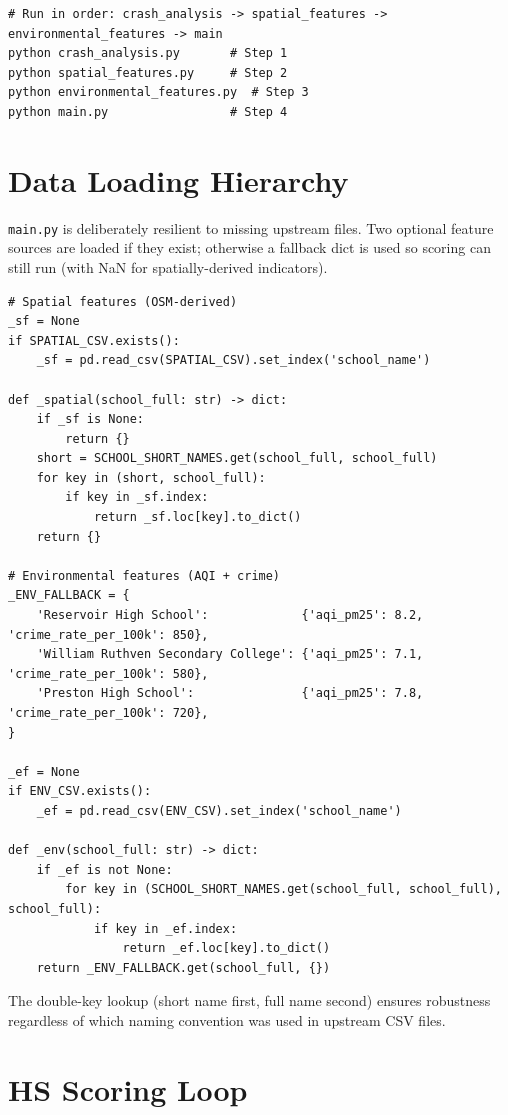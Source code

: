 \documentclass[11pt,a4paper,openany]{book}
\begin{document}
\begin{lstlisting}[style=bash, caption={Running main.py.}]
# Run in order: crash_analysis -> spatial_features -> environmental_features -> main
python crash_analysis.py       # Step 1
python spatial_features.py     # Step 2
python environmental_features.py  # Step 3
python main.py                 # Step 4
\end{lstlisting}

\section{Data Loading Hierarchy}

\texttt{main.py} is deliberately resilient to missing upstream files.
Two optional feature sources are loaded if they exist; otherwise a fallback dict
is used so scoring can still run (with NaN for spatially-derived indicators).

\begin{lstlisting}[style=python, caption={Resilient feature loading in main.py.}]
# Spatial features (OSM-derived)
_sf = None
if SPATIAL_CSV.exists():
    _sf = pd.read_csv(SPATIAL_CSV).set_index('school_name')

def _spatial(school_full: str) -> dict:
    if _sf is None:
        return {}
    short = SCHOOL_SHORT_NAMES.get(school_full, school_full)
    for key in (short, school_full):
        if key in _sf.index:
            return _sf.loc[key].to_dict()
    return {}

# Environmental features (AQI + crime)
_ENV_FALLBACK = {
    'Reservoir High School':             {'aqi_pm25': 8.2, 'crime_rate_per_100k': 850},
    'William Ruthven Secondary College': {'aqi_pm25': 7.1, 'crime_rate_per_100k': 580},
    'Preston High School':               {'aqi_pm25': 7.8, 'crime_rate_per_100k': 720},
}

_ef = None
if ENV_CSV.exists():
    _ef = pd.read_csv(ENV_CSV).set_index('school_name')

def _env(school_full: str) -> dict:
    if _ef is not None:
        for key in (SCHOOL_SHORT_NAMES.get(school_full, school_full), school_full):
            if key in _ef.index:
                return _ef.loc[key].to_dict()
    return _ENV_FALLBACK.get(school_full, {})
\end{lstlisting}

The double-key lookup (short name first, full name second) ensures robustness
regardless of which naming convention was used in upstream CSV files.

\section{HS Scoring Loop}
\end{document}
